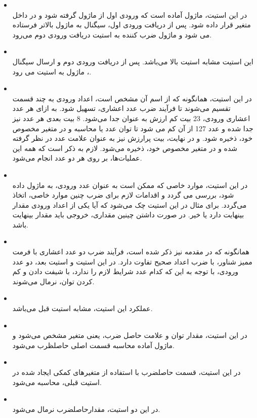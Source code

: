 \documentclass[12pt,titlepage,a4page , tikz , multi,table , svgnames,xcdraw]{article}
\begin{document}
\begin{itemize}
\item {} \\
در این استیت، ماژول آماده است که ورودی اول از ماژول  گرفته شود و در داخل متغیر  قرار داده شود. پس از دریافت ورودی اول، سیگنال  به ماژول بالاتر فرستاده می شود و ماژول ضرب کننده به استیت دریافت ورودی دوم می‌رود.
\item {} \\
این استیت مشابه استیت بالا می‌باشد. پس از دریافت ورودی دوم و ارسال سیگنال ، ماژول به استیت  می رود.
\item {} \\
در این استیت، همانگونه که از اسم آن مشخص است، اعداد ورودی به چند قسمت تقسیم می‌شوند تا فرآیند ضرب عدد اعشاری، تسهیل شود. به ازای هر عدد اعشاری ورودی، 23 بیت کم ارزش به عنوان  جدا می‌شود. 8 بیت بعدی هر عدد نیز جدا شده و عدد 127 از آن کم می شود تا توان عدد یا  محاسبه و در متغیر مخصوص خود، ذخیره شود. و در نهایت، بیت پرارزش نیز به عنوان علامت عدد در نظر گرفته شده و در متغیر مخصوص خود، ذخیره می‌شود. لازم به ذکر است که همه این عملیات‌ها، بر روی هر دو عدد انجام می‌شود.
\item {} \\
در این استیت، موارد خاصی که ممکن است به عنوان عدد ورودی، به ماژول داده شود، بررسی می گردد و اقدامات لازم برای ضرب چنین موارد خاصی، اتخاذ می‌گردد. برای مثال در این استیت چک می‌شود که آیا یکی از اعداد ورودی مقدار بینهایت دارد یا خیر. در صورت داشتن چینین مقداری، خروجی باید مقدار بینهایت باشد.
\item {} \\
همانگونه که در مقدمه نیز ذکر شده است، فرآیند ضرب دو عدد اعشاری با فرمت ممیز شناور، با ضرب اعداد صحیح تفاوت دارد. در این استیت و استیت بعد، دو عدد ورودی، با توجه به این که کدام عدد شرایط لازم را ندارد، با شیفت دادن و کم کردن توان، نرمال می‌شوند.
\item {} \\
عملکرد این استیت، مشابه استیت قبل می‌باشد. 
\item {} \\
در این استیت، مقدار توان و علامت حاصل ضرب، یعنی متغیر  مشخص می‌شود و ماژول آماده محاسبه قسمت اصلی حاصلظرب می‌شود.
\item {} \\
در این استیت، قسمت  حاصلضرب با استفاده از متغیرهای کمکی ایجاد شده در استیت قبلی، محاسبه می‌شود.
\item {} \\
در این دو استیت، مقدارحاصلضرب نرمال می‌شود.


\end{itemize}
\end{document}
